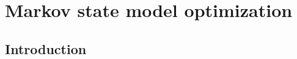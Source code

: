\let\textcircled=\pgftextcircled
\chapter{Markov state model optimization}\label{chap:msm}

\section{Introduction}



